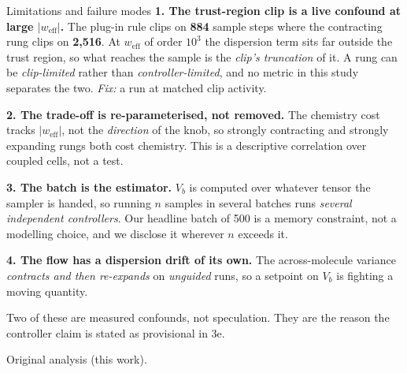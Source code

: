 \documentclass[aspectratio=169,10pt]{beamer}
\newcommand{\theslidelabel}{}
\newcommand{\lbl}[1]{\renewcommand{\theslidelabel}{#1}}
\newcommand{\srcs}[1]{\vfill{\raggedleft\color{grayt}\fontsize{4.9}{5.6}\selectfont #1\par}}
\newcommand{\weff}{w_{\mathrm{eff}}}
\newcommand{\Vb}{V_{b}}
\newcommand{\take}[1]{\vspace{0.4ex}\colorbox{black!6}{\parbox{0.97\linewidth}{\footnotesize #1}}}
\begin{document}
\lbl{3d}
\begin{frame}{Limitations and failure modes}
  \textbf{1. The trust-region clip is a live confound at large $|\weff|$.}
  The plug-in rule clips on \textbf{884} sample steps where the contracting rung
  clips on \textbf{2{,}516}. At $\weff$ of order $10^3$ the dispersion term sits far
  outside the trust region, so what reaches the sample is the \emph{clip's
  truncation} of it. A rung can be \emph{clip-limited} rather than
  \emph{controller-limited}, and no metric in this study separates the two.
  \emph{Fix:} a run at matched clip activity.

  \medskip
  \textbf{2. The trade-off is re-parameterised, not removed.} The chemistry cost
  tracks $|\weff|$, not the \emph{direction} of the knob, so strongly contracting and
  strongly expanding rungs both cost chemistry. This is a descriptive correlation
  over coupled cells, not a test.

  \medskip
  \textbf{3. The batch is the estimator.} $\Vb$ is computed over whatever tensor the
  sampler is handed, so running $n$ samples in several batches runs \emph{several
  independent controllers}. Our headline batch of 500 is a memory constraint, not a
  modelling choice, and we disclose it wherever $n$ exceeds it.

  \medskip
  \textbf{4. The flow has a dispersion drift of its own.} The across-molecule
  variance \emph{contracts and then re-expands} on \emph{unguided} runs, so a
  setpoint on $\Vb$ is fighting a moving quantity.

  \take{Two of these are measured confounds, not speculation. They are the reason the
  controller claim is stated as provisional in 3e.}

  \srcs{Original analysis (this work).}
\end{frame}
\end{document}
